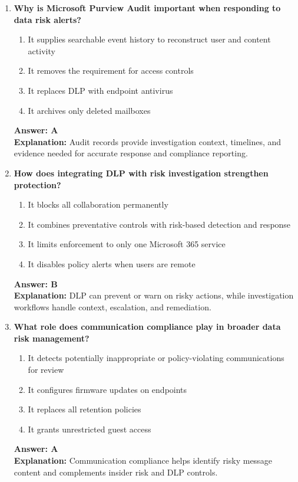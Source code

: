 \documentclass[10pt]{article}
\begin{document}
\begin{enumerate}[leftmargin=*]
\item \textbf{Why is Microsoft Purview Audit important when responding to data risk alerts?}
\begin{enumerate}[label=\Alph*.]
  \item It supplies searchable event history to reconstruct user and content activity
  \item It removes the requirement for access controls
  \item It replaces DLP with endpoint antivirus
  \item It archives only deleted mailboxes
\end{enumerate}
\textbf{Answer: A}\\
\textbf{Explanation:} Audit records provide investigation context, timelines, and evidence needed for accurate response and compliance reporting.

\item \textbf{How does integrating DLP with risk investigation strengthen protection?}
\begin{enumerate}[label=\Alph*.]
  \item It blocks all collaboration permanently
  \item It combines preventative controls with risk-based detection and response
  \item It limits enforcement to only one Microsoft 365 service
  \item It disables policy alerts when users are remote
\end{enumerate}
\textbf{Answer: B}\\
\textbf{Explanation:} DLP can prevent or warn on risky actions, while investigation workflows handle context, escalation, and remediation.

\item \textbf{What role does communication compliance play in broader data risk management?}
\begin{enumerate}[label=\Alph*.]
  \item It detects potentially inappropriate or policy-violating communications for review
  \item It configures firmware updates on endpoints
  \item It replaces all retention policies
  \item It grants unrestricted guest access
\end{enumerate}
\textbf{Answer: A}\\
\textbf{Explanation:} Communication compliance helps identify risky message content and complements insider risk and DLP controls.


\end{enumerate}
\end{document}
